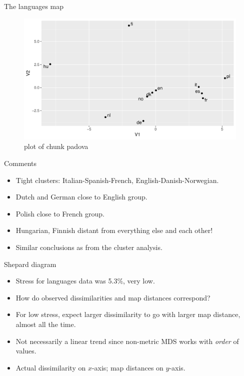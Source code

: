 \documentclass[ignorenonframetext,]{beamer}
\begin{document}
\begin{frame}{The languages map}
\protect\hypertarget{the-languages-map}{}

\begin{figure}
\centering
\includegraphics{figure/padova-1.pdf}
\caption{plot of chunk padova}
\end{figure}

\end{frame}

\begin{frame}{Comments}
\protect\hypertarget{comments-22}{}

\begin{itemize}
\item
  Tight clusters: Italian-Spanish-French, English-Danish-Norwegian.
\item
  Dutch and German close to English group.
\item
  Polish close to French group.
\item
  Hungarian, Finnish distant from everything else and each other!
\item
  Similar conclusions as from the cluster analysis.
\end{itemize}

\end{frame}

\begin{frame}{Shepard diagram}
\protect\hypertarget{shepard-diagram}{}

\begin{itemize}
\item
  Stress for languages data was 5.3\%, very low.
\item
  How do observed dissimilarities and map distances correspond?
\item
  For low stress, expect larger dissimilarity to go with larger map
  distance, almost all the time.
\item
  Not necessarily a linear trend since non-metric MDS works with
  \emph{order} of values.
\item
  Actual dissimilarity on \(x\)-axis; map distances on \(y\)-axis.
\end{itemize}

\end{frame}
\end{document}
